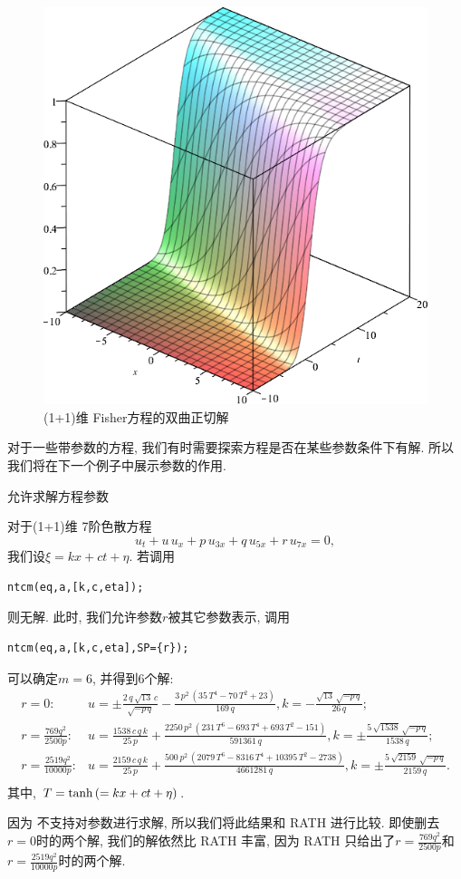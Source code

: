 \begin{example}
\begin{figure}[htbp]
\centering
\includegraphics[width=.45\textwidth]{fig/(1+1)Fisher-tanh.png}
\caption{(1+1)维 Fisher方程的双曲正切解\label{fisher-tanh}}
\end{figure}
    
\end{example}

对于一些带参数的方程, 我们有时需要探索方程是否在某些参数条件下有解. 所以我们将在下一个例子中展示参数的作用.

\begin{example}允许求解方程参数

对于(1+1)维 7阶色散方程\cite{duffy1996travelling}
\begin{equation}
    {{u}_{t}}+u\,{{u}_{x}}+p\,{{u}_{3x}}+q\,{{u}_{5x}}+r\,{{u}_{7x}}=0,
\end{equation}
我们设$\xi=kx+ct+\eta$. 若调用
\begin{verbatim}
ntcm(eq,a,[k,c,eta]);
\end{verbatim}
则无解. 此时, 我们允许参数$r$被其它参数表示, 调用
\begin{verbatim}
ntcm(eq,a,[k,c,eta],SP={r});
\end{verbatim}
可以确定$m=6$, 并得到6个解:
\begin{equation}
\renewcommand{\arraystretch}{1.2}
\begin{array}{rl}
r=0:& u=\pm \frac{2\,q\,\sqrt {13}\,c}{\sqrt {-p\,q}}-\frac{3\,{p}^{2}\,\left( 35\,{T}^{4}-70\,{T}^{2}+23\right) }{169\,q},k=-\frac{\sqrt {13}\,\sqrt {-p\,q}}{26\,q};\\
r=\frac{769 q^2}{2500 p}:& u=\frac{1538\,c\,q\,k}{25\,p}+\frac{2250\,{p}^{2}\,\left( 231\,{T}^{6}-693\,{T}^{4}+693\,{T}^{2}-151\right) }{591361\,q},k=\pm \frac{5\,\sqrt {1538}\,\sqrt {-p\,q}}{1538\,q};\\
r=\frac{2519 q^2}{10000 p}:& u=\frac{2159\,c\,q\,k}{25\,p}+\frac{500\,{p}^{2}\,\left( 2079\,{T}^{6}-8316\,{T}^{4}+10395\,{T}^{2}-2738\right) }{4661281\,q},k=\pm\frac{5\,\sqrt {2159}\,\sqrt {-p\,q}}{2159\,q}.\\
\end{array}
\end{equation}
其中, $T=\tanh\left(=kx+ct+\eta\right)$. 

因为 不支持对参数进行求解, 所以我们将此结果和 RATH 进行比较. 即使删去$r=0$时的两个解, 我们的解依然比 RATH\cite[p21]{liu2001master} 丰富, 因为 RATH 只给出了$r=\frac{769 q^2}{2500 p}$和$r=\frac{2519 q^2}{10000 p}$时的两个解.
\end{example}


